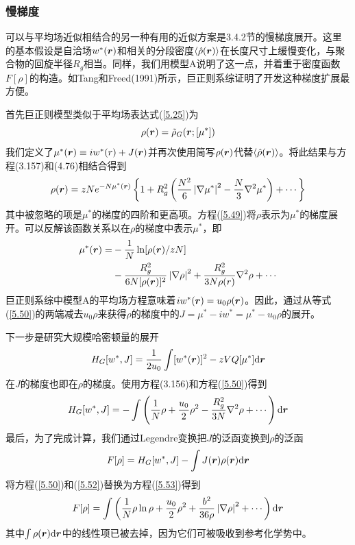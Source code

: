 \subsubsection{慢梯度}
可以与平均场近似相结合的另一种有用的近似方案是3.4.2节的慢梯度展开。这里的基本假设是自洽场$w^*(\bm{r})$和相关的分段密度$\left\langle\hat{\rho}(\bm{r})\right\rangle$在长度尺寸上缓慢变化，与聚合物的回旋半径$R_g$相当。同样，我们用模型A说明了这一点，并着重于密度函数$F[\rho]$的构造。如Tang和Freed(1991)所示，巨正则系综证明了开发这种梯度扩展最方便。

首先巨正则模型类似于平均场表达式(\ref{5.25})为
\begin{equation}
\rho(\bm{r})=\tilde{\rho}_G(\bm{r};[\mu^*])
\end{equation}
我们定义了$\mu^*(\bm{r})\equiv iw^*(r)+J(\bm{r})$并再次使用简写$\rho(\bm{r})$代替$\left\langle\hat{\rho}(\bm{r})\right\rangle$。将此结果与方程(3.157)和(4.76)相结合得到
\begin{equation}\label{5.49}
\rho(\bm{r})=zNe^{-N\mu^*(\bm{r})}\left\{1+R_g^2\left(\frac{N^2}{6}\left|\nabla\mu^*\right|^2-\frac{N}{3}\nabla^2\mu^*\right)+\cdots\right\}
\end{equation}
其中被忽略的项是$\mu^*$的梯度的四阶和更高项。方程(\ref{5.49})将$\rho$表示为$\mu^*$的梯度展开。可以反解该函数关系以在$\rho$的梯度中表示$\mu^*$，即
\begin{equation}\label{5.50}
\begin{aligned}
\mu^*(\bm{r})=&-\frac{1}{N}\ln[\rho(\bm{r})/zN]\\
&-\frac{R_g^2}{6N[\rho(\bm{r})]^2}\left|\nabla\rho\right|^2+\frac{R_g^2}{3N\rho(r)}\nabla^2\rho+\cdots
\end{aligned}
\end{equation}
巨正则系综中模型A的平均场方程意味着$iw^*(\bm{r})=u_0\rho(\bm{r})$。因此，通过从等式(\ref{5.50})的两端减去$u_0\rho$来获得$\rho$的梯度中的$J=\mu^*-iw^*=\mu^*-u_0\rho$的展开。

下一步是研究大规模哈密顿量的展开
\begin{equation}
H_G[w^*,J]=\frac{1}{2u_0}\int[w^*(\bm{r})]^2-zVQ[\mu^*]\mathrm{d}\bm{r}
\end{equation}
在$J$的梯度也即在$\rho$的梯度。使用方程(3.156)和方程(\ref{5.50})得到
\begin{equation}\label{5.52}
H_G[w^*,J]=-\int\left(\frac{1}{N}\rho+\frac{u_0}{2}\rho^2-\frac{R_g^2}{3N}\nabla^2\rho+\cdots\right)\mathrm{d}\bm{r}
\end{equation}
最后，为了完成计算，我们通过Legendre变换把$J$的泛函变换到$\rho$的泛函
\begin{equation}\label{5.53}
F[\rho]=H_G[w^*,J]-\int J(\bm{r})\rho(\bm{r})\mathrm{d}\bm{r}
\end{equation}
将方程(\ref{5.50})和(\ref{5.52})替换为方程(\ref{5.53})得到
\begin{equation}\label{5.54}
F[\rho]=\int\left(\frac{1}{N}\rho\ln\rho+\frac{u_0}{2}\rho^2+\frac{b^2}{36\rho}\left|\nabla\rho\right|^2+\cdots\right)\mathrm{d}\bm{r}
\end{equation}
其中$\int\rho(\bm{r})\mathrm{d}\bm{r}$中的线性项已被去掉，因为它们可被吸收到参考化学势中。

